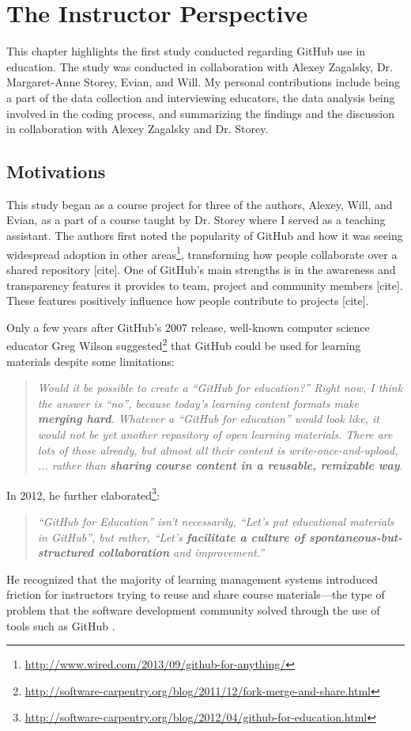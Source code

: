 \chapter{The Instructor Perspective}
This chapter highlights the first study conducted regarding GitHub use in education. The study was conducted in collaboration with Alexey Zagalsky, Dr. Margaret-Anne Storey, Evian, and Will. My personal contributions include being a part of the data collection and interviewing educators, the data analysis being involved in the coding process, and summarizing the findings and the discussion in collaboration with Alexey Zagalsky and Dr. Storey. %

\section{Motivations}
This study began as a course project for three of the authors, Alexey, Will, and Evian, as a part of a course taught by Dr. Storey where I served as a teaching assistant. The authors first noted the popularity of GitHub and how it was seeing widespread adoption in other areas\footnote{\url{http://www.wired.com/2013/09/github-for-anything/}}, transforming how people collaborate over a shared repository [cite]. One of GitHub's main strengths is in the awareness and transparency features it provides to team, project and community members [cite]. These features positively influence how people contribute to projects [cite].


Only a few years after GitHub's 2007 release, well-known computer science educator Greg Wilson suggested\footnote{\url{http://software-carpentry.org/blog/2011/12/fork-merge-and-share.html}} that GitHub could be used for learning materials despite some limitations: \begin{quote}\textit{Would it be possible to create a ``GitHub for education?'' Right now, I think the answer is ``no'', because today's learning content formats make \textbf{merging hard}. Whatever a ``GitHub for education'' would look like, it would not be yet another repository of open learning materials. There are lots of those already, but almost all their content is write-once-and-upload, ... rather than \textbf{sharing course content in a reusable, remixable way}}.\end{quote}
In 2012, he further elaborated\footnote{\url{http://software-carpentry.org/blog/2012/04/github-for-education.html}}: \begin{quote}\textit{``GitHub for Education'' isn't necessarily, ``Let's put educational materials in GitHub'', but rather, ``Let's \textbf{facilitate a culture of spontaneous-but-structured collaboration} and improvement.''}\end{quote} He recognized that the majority of learning management systems introduced friction for instructors trying to reuse and share course materials---the type of problem that the software development community solved through the use of tools such as GitHub \cite{Dabbish:2012:SCG:2145204.2145396}.


